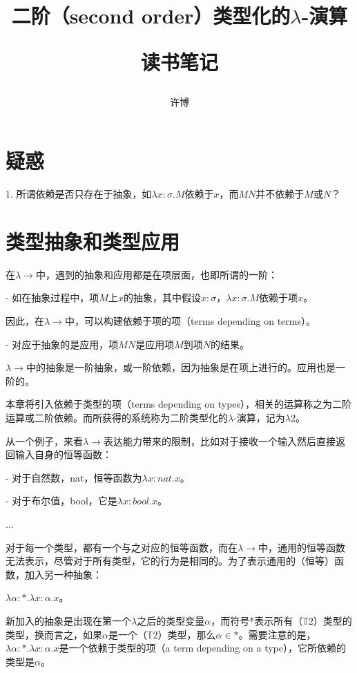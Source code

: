 \documentclass[UTF8]{article}
\title{二阶（second order）类型化的$\lambda$-演算\\[2ex]\begin{large}读书笔记\end{large}}
\author{许博}
\date{}
\begin{document}
\maketitle
	\section{疑惑}
	
	1. 所谓依赖是否只存在于抽象，如$\lambda x:\sigma.M$依赖于$x$，而$MN$并不依赖于$M$或$N$？

	\section{类型抽象和类型应用}
		\noindent
		在$\lambda{\rightarrow}$中，遇到的抽象和应用都是在项层面，也即所谓的一阶：
		
		\noindent
		- 如在抽象过程中，项$M$上$x$的抽象，其中假设$x:\sigma$，$\lambda x:\sigma.M$依赖于项$x$。
		
		因此，在$\lambda{\rightarrow}$中，可以构建依赖于项的项（terms depending on terms）。
			
		\noindent
		- 对应于抽象的是应用，项$MN$是应用项$M$到项$N$的结果。
		
		$\lambda{\rightarrow}$中的抽象是一阶抽象，或一阶依赖，因为抽象是在项上进行的。应用也是一阶的。
		
		本章将引入依赖于类型的项（terms depending on types），相关的运算称之为二阶运算或二阶依赖。而所获得的系统称为二阶类型化的$\lambda$-演算，记为$\lambda{2}$。
		
		从一个例子，来看$\lambda{\rightarrow}$表达能力带来的限制，比如对于接收一个输入然后直接返回输入自身的恒等函数：
		
		\noindent
		- 对于自然数，nat，恒等函数为$\lambda x:nat.x$。
		
		\noindent
		- 对于布尔值，bool，它是$\lambda x:bool.x$。
		
		\noindent ...
		
		对于每一个类型，都有一个与之对应的恒等函数，而在$\lambda{\rightarrow}$中，通用的恒等函数无法表示，尽管对于所有类型，它的行为是相同的。为了表示通用的（恒等）函数，加入另一种抽象：
		
		$\lambda\alpha:*.\lambda x:\alpha.x$。
		
		新加入的抽象是出现在第一个$\lambda$之后的类型变量$\alpha$，而符号*表示所有（$\mathbb{T}2$）类型的类型，换而言之，如果$\alpha$是一个（$\mathbb{T}2$）类型，那么$\alpha\in *$。需要注意的是，$\lambda\alpha:*.\lambda x:\alpha.x$是一个依赖于类型的项（a  term depending on a type），它所依赖的类型是$\alpha$。
		
\end{document}

